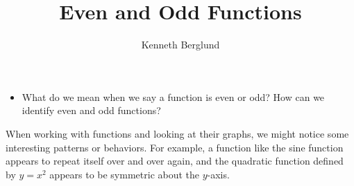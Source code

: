 \documentclass[nooutcomes]{ximera}
\author{Kenneth Berglund}
\title{Even and Odd Functions}
\begin{document}
\licenseAPCSZCSCC
\begin{abstract}
  
\end{abstract}
\maketitle



\begin{motivatingQuestions}\begin{itemize}
\item What do we mean when we say a function is even or odd? How can we identify even and odd functions?
\end{itemize}\end{motivatingQuestions}



When working with functions and looking at their graphs, we might notice some interesting patterns or behaviors. For example, a function like the sine function appears to repeat itself over and over again, and the quadratic function defined by $y = x^2$ appears to be symmetric about the $y$-axis. 

\begin{image}

\end{image}
\end{document}
